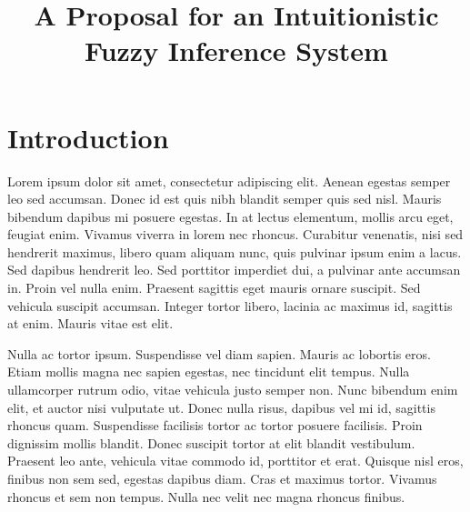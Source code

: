 \documentclass[conference]{IEEEtran}
\begin{document}
\title{A Proposal for an Intuitionistic Fuzzy Inference System}


\author{
  }

\maketitle

\begin{abstract}

\end{abstract}

\IEEEpeerreviewmaketitle



\section{Introduction}

Lorem ipsum dolor sit amet, consectetur adipiscing elit. Aenean egestas semper leo sed accumsan. Donec id est quis nibh blandit semper quis sed nisl. Mauris bibendum dapibus mi posuere egestas. In at lectus elementum, mollis arcu eget, feugiat enim. Vivamus viverra in lorem nec rhoncus. Curabitur venenatis, nisi sed hendrerit maximus, libero quam aliquam nunc, quis pulvinar ipsum enim a lacus. Sed dapibus hendrerit leo. Sed porttitor imperdiet dui, a pulvinar ante accumsan in. Proin vel nulla enim. Praesent sagittis eget mauris ornare suscipit. Sed vehicula suscipit accumsan. Integer tortor libero, lacinia ac maximus id, sagittis at enim. Mauris vitae est elit.

Nulla ac tortor ipsum. Suspendisse vel diam sapien. Mauris ac lobortis eros. Etiam mollis magna nec sapien egestas, nec tincidunt elit tempus. Nulla ullamcorper rutrum odio, vitae vehicula justo semper non. Nunc bibendum enim elit, et auctor nisi vulputate ut. Donec nulla risus, dapibus vel mi id, sagittis rhoncus quam. Suspendisse facilisis tortor ac tortor posuere facilisis. Proin dignissim mollis blandit. Donec suscipit tortor at elit blandit vestibulum. Praesent leo ante, vehicula vitae commodo id, porttitor et erat. Quisque nisl eros, finibus non sem sed, egestas dapibus diam. Cras et maximus tortor. Vivamus rhoncus et sem non tempus. Nulla nec velit nec magna rhoncus finibus.
\end{document}
